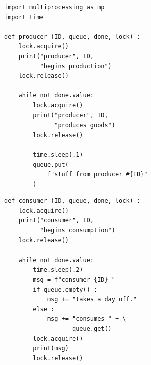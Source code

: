 \begin{frame}[fragile]
%
\begin{tcbraster}[raster columns=2,
                  raster equal height,
                  nobeforeafter,
                  raster column skip=0.2cm]
\begin{codebox}
\begin{verbatim}
import multiprocessing as mp
import time

def producer (ID, queue, done, lock) :
    lock.acquire()
    print("producer", ID,
          "begins production")
    lock.release()
    
    while not done.value:
        lock.acquire()
        print("producer", ID,
              "produces goods")
        lock.release()
        
        time.sleep(.1)
        queue.put(
            f"stuff from producer #{ID}"
        )
\end{verbatim}
\end{codebox}
%
\begin{codebox}[(... continued)]
\begin{verbatim}
def consumer (ID, queue, done, lock) :
    lock.acquire()
    print("consumer", ID,
          "begins consumption")
    lock.release()
    
    while not done.value:
        time.sleep(.2)
        msg = f"consumer {ID} "
        if queue.empty() :
            msg += "takes a day off."
        else :
            msg += "consumes " + \
                   queue.get()
        lock.acquire()
        print(msg)
        lock.release()
\end{verbatim}
\end{codebox}
\end{tcbraster}
%
\end{frame}


